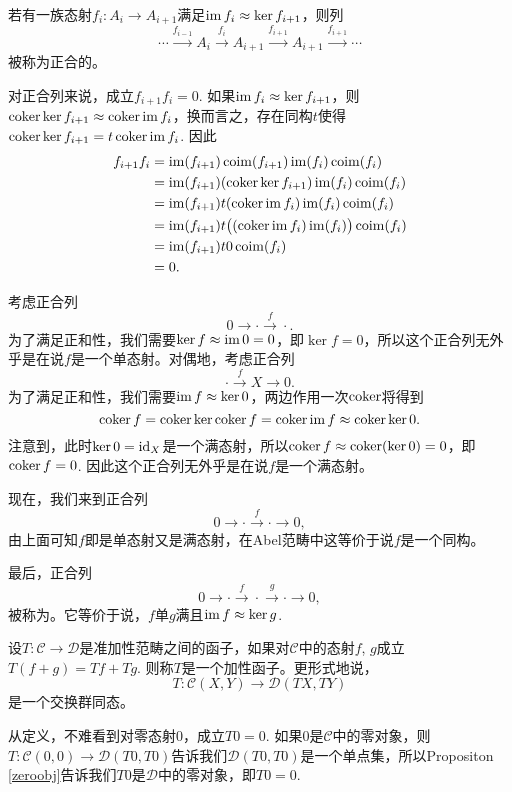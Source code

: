 \begin{para}
若有一族态射$f_i:A_i\to A_{i+1}$满足$\operatorname{im} f_i\approx \ker f_{i+1}$，则列
\[
	\cdots \xrightarrow{f_{i-1}}A_i \xrightarrow{f_i} A_{i+1} \xrightarrow{f_{i+1}} A_{i+1}\xrightarrow{f_{i+1}}\cdots
\]
被称为正合的。
\end{para}

对正合列来说，成立$f_{i+1}f_i=0$. 如果$\operatorname{im} f_i\approx \ker f_{i+1}$，则$\operatorname{coker} \ker f_{i+1} \approx \operatorname{coker} \operatorname{im} f_i$，换而言之，存在同构$t$使得$\operatorname{coker} \ker f_{i+1}=t\operatorname{coker} \operatorname{im} f_i$. 因此
\begin{align*}
f_{i+1}f_i&=\operatorname{im}(f_{i+1})\operatorname{coim}(f_{i+1})\operatorname{im}(f_{i})\operatorname{coim}(f_{i})\\
	&=\operatorname{im}(f_{i+1})(\operatorname{coker} \ker f_{i+1}) \operatorname{im}(f_{i})\operatorname{coim}(f_{i})\\
	&=\operatorname{im}(f_{i+1})t(\operatorname{coker} \operatorname{im} f_i) \operatorname{im}(f_{i})\operatorname{coim}(f_{i})\\
	&=\operatorname{im}(f_{i+1})t\bigl((\operatorname{coker} \operatorname{im} f_i) \operatorname{im}(f_{i})\bigr)\operatorname{coim}(f_{i})\\
	&=\operatorname{im}(f_{i+1})t0\operatorname{coim}(f_{i})\\
	&=0.
\end{align*}

\begin{para}[短正合列]
考虑正合列
\[
	0\to \cdot \xrightarrow{f} \cdot.
\]
为了满足正和性，我们需要$\ker f \approx \operatorname{im} 0=0$，即$\ker f = 0$，所以这个正合列无外乎是在说$f$是一个单态射。对偶地，考虑正合列
\[
	\cdot\xrightarrow{f} X \to  0.
\]
为了满足正和性，我们需要$\operatorname{im} f \approx \ker 0$，两边作用一次$\operatorname{coker}$将得到
\[
	\operatorname{coker} f=\operatorname{coker} \ker \operatorname{coker} f=\operatorname{coker} \operatorname{im} f \approx \operatorname{coker} \ker 0.
\]
注意到，此时$\ker 0=\operatorname{id}_X$是一个满态射，所以$\operatorname{coker} f \approx \operatorname{coker}(\ker 0)=0$，即$\operatorname{coker} f = 0$. 因此这个正合列无外乎是在说$f$是一个满态射。

现在，我们来到正合列
\[
	0\to \cdot \xrightarrow{f} \cdot \to 0,
\]
由上面可知$f$即是单态射又是满态射，在Abel范畴中这等价于说$f$是一个同构。

最后，正合列
\[
	0\to \cdot \xrightarrow{f} \cdot \xrightarrow{g}\cdot\to 0,
\]
被称为。它等价于说，$f$单$g$满且$\operatorname{im} f\approx \ker g$.
\end{para}

\begin{para}
设$T:\mathcal{C}\to \mathcal{D}$是准加性范畴之间的函子，如果对$\mathcal{C}$中的态射$f$, $g$成立$T(f+g)=Tf+Tg$. 则称$T$是一个加性函子。更形式地说，
\[
	T:\mathcal{C}(X,Y)\to \mathcal{D}(TX,TY)
\]
是一个交换群同态。
\end{para}

从定义，不难看到对零态射$0$，成立$T0=0$. 如果$0$是$\mathcal{C}$中的零对象，则$T:\mathcal{C}(0,0)\to \mathcal{D}(T0,T0)$告诉我们$\mathcal{D}(T0,T0)$是一个单点集，所以Propositon \ref{zeroobj}告诉我们$T0$是$\mathcal{D}$中的零对象，即$T0=0$.

